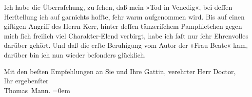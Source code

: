 \pstart
           Ich habe die Überraſchung, zu ſehen, daß mein »Tod in
                  Venedig«, bei deſſen Herſtellung ich {\pb}auf garnichts hoffte, ſehr warm
               aufgenommen wird. Bis auf einen giftigen Angriff des Herrn Kerr, hinter deſſen tänzeriſchem Pamphletchen gegen mich ſich freilich viel Charakter-Elend
               verbirgt, habe ich faſt nur ſehr Ehrenvolles darüber gehört. Und daß die erſte
               Beruhigung vom Autor der »Frau Beate« kam,
               darüber bin ich nun wieder beſonders glücklich.\pend
           
\pstart
           Mit den beſten Empfehlungen an Sie und Ihre Gattin, verehrter Herr Doctor,{\\[\baselineskip]}Ihr ergebenſter{\\[\baselineskip]}\spacefill\mbox{Thomas Mann.}\pend
           \leftskip=0em{}\endnumbering{}  
      